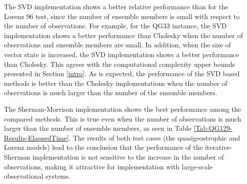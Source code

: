 \documentclass[12pt]{article}
\begin{document}
The SVD implementation shows a better relative performance than for the Lorenz 96 test, since the number of ensemble members is small with respect to the number of observations. For example, for the QG33 instance, the SVD implementation shows a better performance than Cholesky when the number of observations and ensemble members are small. In addition, when the size of vector state is increased, the SVD implementation shows a better performance than Cholesky. This agrees with the computational complexity upper bounds presented  in Section  \ref{intro}. As is expected, the performance of the SVD based methods is better than the Cholesky implementations when the number of observations is much larger than the number of the ensemble members. 

The Sherman-Morrison implementation shows the best performance among the compared methods.
This is true even when the number of observations is much larger than the number of ensemble members, as seen in Table  \ref{Tab:QG129-Results-ElapsedTime}. The results of both test cases (the quasigeostrophic and Lorenz models) lead to the conclusion that the performance of the iterative-Sherman implementation is not sensitive to the increase in the number of observations, making it attractive for implementation with large-scale observational systems.
\end{document}
